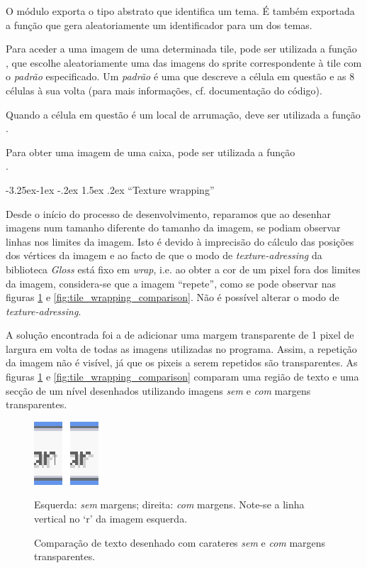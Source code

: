 \documentclass[a4paper]{article}
\makeatletter
\renewcommand\paragraph{\@startsection{paragraph}{4}{\z@}%
	{-3.25ex\@plus -1ex \@minus -.2ex}%
	{1.5ex \@plus .2ex}%
	{\normalfont\normalsize\bfseries}}
\makeatother
\begin{document}
O módulo exporta o tipo abstrato  que identifica um tema. É também exportada a função  que gera aleatoriamente um identificador para um dos temas.

Para aceder a uma imagem de uma determinada tile, pode ser utilizada a função \\, que escolhe aleatoriamente uma das imagens do sprite correspondente à tile com o \emph{padrão} especificado. Um \emph{padrão} é uma  que descreve a célula em questão e as 8 células à sua volta (para mais informações, cf. documentação do código).

Quando a célula em questão é um local de arrumação, deve ser utilizada a função \\.

Para obter uma imagem de uma caixa, pode ser utilizada a função \\.

\paragraph{``Texture wrapping''}

Desde o início do processo de desenvolvimento, reparamos que ao desenhar imagens num tamanho diferente do tamanho da imagem, se podiam observar linhas nos limites da imagem. Isto é devido à imprecisão do cálculo das posições dos vértices da imagem e ao facto de que o modo de \emph{texture-adressing} da biblioteca \emph{Gloss} está fixo em \emph{wrap}, i.e. ao obter a cor de um pixel fora dos limites da imagem, considera-se que a imagem ``repete'', como se pode observar nas figuras \ref{fig:text_wrapping_comparison} e \ref{fig:tile_wrapping_comparison}. Não é possível alterar o modo de \emph{texture-adressing}.

A solução encontrada foi a de adicionar uma margem transparente de 1 pixel de largura em volta de todas as imagens utilizadas no programa. Assim, a repetição da imagem não é visível, já que os pixeis a serem repetidos são transparentes. As figuras \ref{fig:text_wrapping_comparison} e \ref{fig:tile_wrapping_comparison} comparam uma região de texto e uma secção de um nível desenhados utilizando imagens \emph{sem} e \emph{com} margens transparentes.

\begin{figure}[ht]
	\centering
	\includegraphics[height=0.15\textheight]{images/text_wrapping_comparison.png}
	\caption{Comparação de texto desenhado com carateres \emph{sem} e \emph{com} margens transparentes.}
	\label{fig:text_wrapping_comparison}
	\smallskip\small
	Esquerda: \emph{sem} margens; direita: \emph{com} margens. Note-se a linha vertical no `r' da imagem esquerda.
\end{figure}
\end{document}
